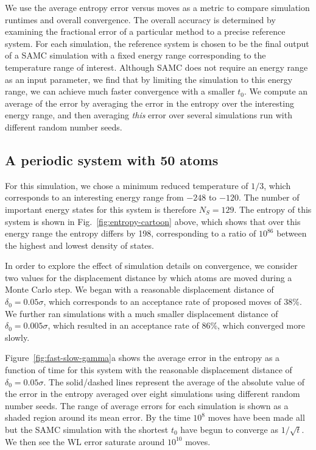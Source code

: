 \documentclass[letterpaper,twocolumn,amsmath,amssymb,pre,aps,10pt]{revtex4-1}
\begin{document}
We use the average entropy error versus moves as a metric to compare
simulation runtimes and overall convergence. The overall accuracy
is determined by examining the fractional error of a particular method to
a precise reference system. For each simulation, the reference system
is chosen to be the final output of a SAMC simulation with a fixed energy range
corresponding to the temperature range of interest.
Although SAMC does not require an energy range as an input parameter,
we find that by limiting the simulation to this energy range, we can
achieve much faster convergence with a smaller $t_0$.  We compute an average
of the error by averaging the error in the entropy over the
interesting energy range, and then averaging \emph{this} error over several
simulations run with different random number seeds.

\subsection{A periodic system with 50 atoms}

For this simulation, we chose a minimum reduced
temperature of $1/3$, which corresponds to an interesting energy range
from $-248$ to $-120$.  The number of important energy states
for this system is therefore $N_S = 129$.  The entropy of this system is shown in
Fig.~\ref{fig:entropy-cartoon} above, which shows that over this
energy range the entropy differs by 198, corresponding to a ratio of
$10^{86}$ between the highest and lowest density of states.

In order to explore the effect of simulation details on convergence,
we consider two values for the displacement distance by which atoms
are moved during a Monte Carlo step.  We began with a reasonable
displacement distance of $\delta_0 = 0.05\sigma$, which corresponds to
an acceptance rate of proposed moves of 38\%.  We further ran
simulations with a much smaller displacement distance of $\delta_0 =
0.005\sigma$, which resulted in an acceptance rate of 86\%, which
converged more slowly.

Figure~\ref{fig:fast-slow-gamma}a shows the average error in the
entropy as a function of time for this system with the reasonable
displacement distance of $\delta_0 = 0.05\sigma$.  The solid/dashed lines
represent the average of the absolute value of the error in the
entropy averaged over eight simulations using different random number
seeds.  The range of average errors for each simulation is shown as a
shaded region around its mean error.  By the time $10^8$ moves have
been made all but the SAMC simulation with the shortest $t_0$ have
begun to converge as $1/\sqrt{t}$.  We then see the WL error
saturate around $10^{10}$ moves.
\end{document}
